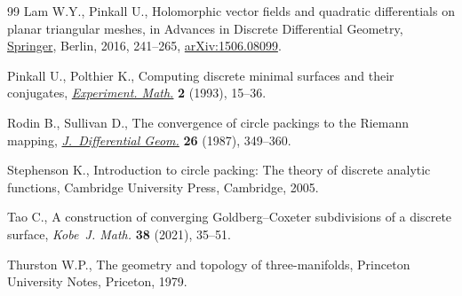 \begin{thebibliography}{99}
Lam W.Y., Pinkall U., Holomorphic vector fields and quadratic differentials on
  planar triangular meshes, in Advances in {D}iscrete {D}ifferential
  {G}eometry,  \href{https://doi.org/10.1007/978-3-662-50447-5_7}{Springer}, Berlin, 2016, 241--265, \href{https://arxiv.org/abs/1506.08099}{arXiv:1506.08099}.

Pinkall U., Polthier K., Computing discrete minimal surfaces and their
  conjugates,  \href{https://doi.org/10.1080/10586458.1993.10504266}{\textit{Experiment. Math.}} \textbf{2} (1993), 15--36.

Rodin B., Sullivan D., The convergence of circle packings to the {R}iemann
  mapping,  \href{https://doi.org/10.4310/jdg/1214441375}{\textit{J.~Differential Geom.}} \textbf{26} (1987), 349--360.

Stephenson K., Introduction to circle packing: {T}he theory of discrete
  analytic functions, Cambridge University Press, Cambridge, 2005.

Tao C., A construction of converging {G}oldberg--{C}oxeter subdivisions of a
  discrete surface, \textit{Kobe~J. Math.} \textbf{38} (2021), 35--51.

Thurston W.P., The geometry and topology of three-manifolds, Princeton
  University Notes, Priceton, 1979.

\end{thebibliography}

